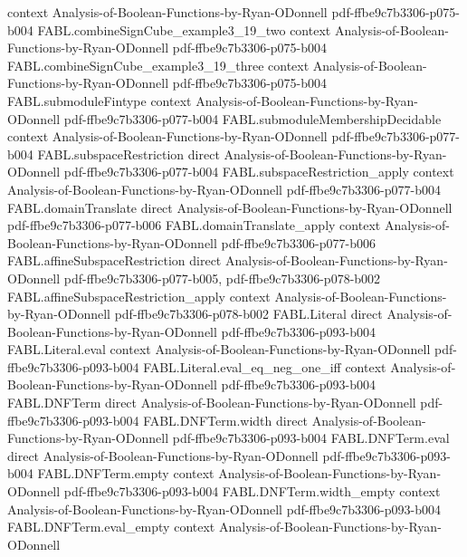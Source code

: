 \begin{theorem}
  {context}
  {Analysis-of-Boolean-Functions-by-Ryan-ODonnell}
  {pdf-ffbe9c7b3306-p075-b004}
\proofstep
  {FABL.combineSignCube_example3_19_two}
  {context}
  {Analysis-of-Boolean-Functions-by-Ryan-ODonnell}
  {pdf-ffbe9c7b3306-p075-b004}
\proofstep
  {FABL.combineSignCube_example3_19_three}
  {context}
  {Analysis-of-Boolean-Functions-by-Ryan-ODonnell}
  {pdf-ffbe9c7b3306-p075-b004}
\proofstep
  {FABL.submoduleFintype}
  {context}
  {Analysis-of-Boolean-Functions-by-Ryan-ODonnell}
  {pdf-ffbe9c7b3306-p077-b004}
\proofstep
  {FABL.submoduleMembershipDecidable}
  {context}
  {Analysis-of-Boolean-Functions-by-Ryan-ODonnell}
  {pdf-ffbe9c7b3306-p077-b004}
\proofstep
  {FABL.subspaceRestriction}
  {direct}
  {Analysis-of-Boolean-Functions-by-Ryan-ODonnell}
  {pdf-ffbe9c7b3306-p077-b004}
\proofstep
  {FABL.subspaceRestriction_apply}
  {context}
  {Analysis-of-Boolean-Functions-by-Ryan-ODonnell}
  {pdf-ffbe9c7b3306-p077-b004}
\proofstep
  {FABL.domainTranslate}
  {direct}
  {Analysis-of-Boolean-Functions-by-Ryan-ODonnell}
  {pdf-ffbe9c7b3306-p077-b006}
\proofstep
  {FABL.domainTranslate_apply}
  {context}
  {Analysis-of-Boolean-Functions-by-Ryan-ODonnell}
  {pdf-ffbe9c7b3306-p077-b006}
\proofstep
  {FABL.affineSubspaceRestriction}
  {direct}
  {Analysis-of-Boolean-Functions-by-Ryan-ODonnell}
  {pdf-ffbe9c7b3306-p077-b005,
    pdf-ffbe9c7b3306-p078-b002}
\proofstep
  {FABL.affineSubspaceRestriction_apply}
  {context}
  {Analysis-of-Boolean-Functions-by-Ryan-ODonnell}
  {pdf-ffbe9c7b3306-p078-b002}
\proofstep
  {FABL.Literal}
  {direct}
  {Analysis-of-Boolean-Functions-by-Ryan-ODonnell}
  {pdf-ffbe9c7b3306-p093-b004}
\proofstep
  {FABL.Literal.eval}
  {context}
  {Analysis-of-Boolean-Functions-by-Ryan-ODonnell}
  {pdf-ffbe9c7b3306-p093-b004}
\proofstep
  {FABL.Literal.eval_eq_neg_one_iff}
  {context}
  {Analysis-of-Boolean-Functions-by-Ryan-ODonnell}
  {pdf-ffbe9c7b3306-p093-b004}
\proofstep
  {FABL.DNFTerm}
  {direct}
  {Analysis-of-Boolean-Functions-by-Ryan-ODonnell}
  {pdf-ffbe9c7b3306-p093-b004}
\proofstep
  {FABL.DNFTerm.width}
  {direct}
  {Analysis-of-Boolean-Functions-by-Ryan-ODonnell}
  {pdf-ffbe9c7b3306-p093-b004}
\proofstep
  {FABL.DNFTerm.eval}
  {direct}
  {Analysis-of-Boolean-Functions-by-Ryan-ODonnell}
  {pdf-ffbe9c7b3306-p093-b004}
\proofstep
  {FABL.DNFTerm.empty}
  {context}
  {Analysis-of-Boolean-Functions-by-Ryan-ODonnell}
  {pdf-ffbe9c7b3306-p093-b004}
\proofstep
  {FABL.DNFTerm.width_empty}
  {context}
  {Analysis-of-Boolean-Functions-by-Ryan-ODonnell}
  {pdf-ffbe9c7b3306-p093-b004}
\proofstep
  {FABL.DNFTerm.eval_empty}
  {context}
  {Analysis-of-Boolean-Functions-by-Ryan-ODonnell}

\end{theorem}
